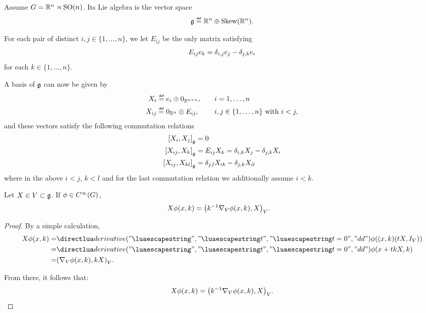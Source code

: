 \begin{example}
    Assume $G = \mathbb{R}^n \rtimes {\mathrm{SO} (n)}$.
    Its Lie algebra is the vector space
    \begin{align*}
        \LieAlgebra \defeq \R^n \oplus \SkewSymmetric {\R^n}.
    \end{align*}

    For each pair of distinct $i, j \in \{1, \dots, n\}$,
    we let $E_{ij}$ be the only matrix satisfying
    \begin{align*}
        E_{ij} e_k = \delta_{i,j} e_j - \delta_{j,k} e_i
    \end{align*}
    for each $k \in \{1, \dots, n\}$.

    A basis of $\mathfrak{g}$ can now be given by
    \begin{align*}
        X_i &\defeq e_i \oplus 0_{\SquareMatrices n}, &\quad &i = 1, \dots, n\\
        X_{ij} &\defeq 0_{\R^n} \oplus E_{ij}, &\quad &i,j \in \{1, \dots, n\} \text{ with } i < j,
    \end{align*}
    and these vectors satisfy the following commutation relations
    \begin{align*}
        {[X_i, X_j]}_{\mathfrak{g}} &= 0\\
        {[X_{ij}, X_{k}]}_{\mathfrak{g}} &= E_{ij} X_k = \delta_{i,k} X_j - \delta_{j,k} X_i\\
        {[X_{ij}, X_{kl}]}_{\mathfrak{g}} &= \delta_{j,l} X_{i k} - \delta_{j,k} X_{i l}
    \end{align*}
    where in the above $i < j$, $k < l$ and
    for the last commutation relation we additionally assume $i < k$.
\end{example}

\begin{lemma}
    Let $X \in V \subset \mathfrak{g}$.
    If $\phi \in {C^\infty(G)}$,
    \begin{align*}
        {X} \phi(x, k)
        &= {\left(k^{-1} \nabla_{V} \phi(x, k), X\right)_{V}}.
    \end{align*}
\end{lemma}
\begin{proof}
    By a simple calculation,
    \begin{align*}
        \LeftDifferentialOperatorFirstOrder{X} \phi(x, k)
        =& \D*{t}<t = 0> \phi((x, k) (t X, \Id\VectorSpace))\\
        =& \D*{t}<t = 0> \phi(x + t k X, k)\\
        =& \ip{\grad \phi(x, k)}{k X}.
    \end{align*}

    From there, it follows that:
    \begin{align*}
        {X} \phi(x, k)
        = {\left(k^{-1} \nabla_{V} \phi(x, k), X\right)_{V}}.
    \end{align*}
\end{proof}

